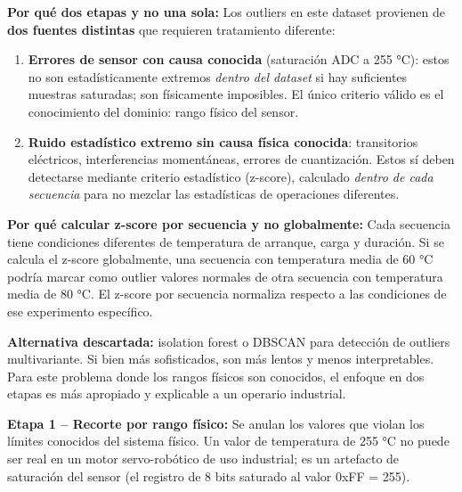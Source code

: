 \documentclass[12pt,a4paper]{article}
\begin{document}
\begin{whybox}
\textbf{Por qué dos etapas y no una sola:}
Los outliers en este dataset provienen de \textbf{dos fuentes distintas} que requieren
tratamiento diferente:

\begin{enumerate}[leftmargin=1.5em]
  \item \textbf{Errores de sensor con causa conocida} (saturación ADC a 255 °C):
    estos no son estadísticamente extremos \emph{dentro del dataset} si hay suficientes
    muestras saturadas; son físicamente imposibles. El único criterio válido es el
    conocimiento del dominio: rango físico del sensor.

  \item \textbf{Ruido estadístico extremo sin causa física conocida}: transitorios
    eléctricos, interferencias momentáneas, errores de cuantización. Estos sí deben
    detectarse mediante criterio estadístico (z-score), calculado \emph{dentro de cada
    secuencia} para no mezclar las estadísticas de operaciones diferentes.
\end{enumerate}

\textbf{Por qué calcular z-score por secuencia y no globalmente:}
Cada secuencia tiene condiciones diferentes de temperatura de arranque, carga y
duración. Si se calcula el z-score globalmente, una secuencia con temperatura media
de 60 °C podría marcar como outlier valores normales de otra secuencia con
temperatura media de 80 °C. El z-score por secuencia normaliza respecto a las
condiciones de ese experimento específico.

\textbf{Alternativa descartada:} isolation forest o DBSCAN para detección de
outliers multivariante. Si bien más sofisticados, son más lentos y menos
interpretables. Para este problema donde los rangos físicos son conocidos, el
enfoque en dos etapas es más apropiado y explicable a un operario industrial.
\end{whybox}

\textbf{Etapa 1 -- Recorte por rango físico:}
Se anulan los valores que violan los límites conocidos del sistema físico.
Un valor de temperatura de 255 °C no puede ser real en un motor servo-robótico de
uso industrial; es un artefacto de saturación del sensor (el registro de 8 bits
saturado al valor 0xFF = 255).
\end{document}
